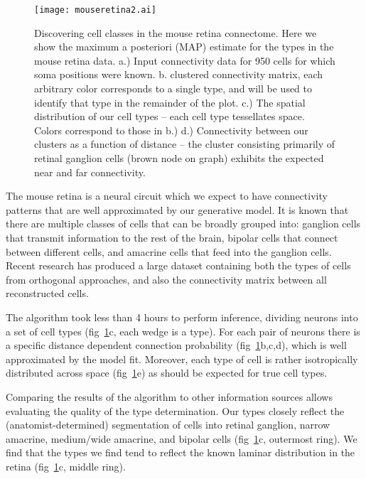 \documentclass{article}
\begin{document}
\begin{figure}
  \centering 
  \centerline{\texttt{[image: mouseretina2.ai]}}
  \caption{Discovering cell classes in the mouse retina connectome. Here
we show the maximum a posteriori (MAP) estimate for the types in the mouse
retina data. 
    a.) Input connectivity data for 950 cells for which soma positions
    were known. b. clustered connectivity matrix, each arbitrary color
    corresponds to a single type, and will be used to identify that type in the remainder
    of the plot. c.)  The spatial distribution of our cell types
    -- each cell type tessellates space. Colors correspond to those in b.)
    d.) Connectivity between our clusters as a function
    of distance -- the cluster consisting primarily of retinal
    ganglion cells (brown node on graph) exhibits the expected near and
    far connectivity.}
\label{fig:mouseretina}
\end{figure}

The mouse retina \autocite{Masland2001} is a neural circuit which we
expect to have connectivity patterns that are well approximated by our
generative model. It is known that there are multiple classes of cells
that can be broadly grouped into: ganglion cells that transmit
information to the rest of the brain, bipolar cells that connect
between different cells, and amacrine cells that feed into the
ganglion cells. Recent research \autocite{Helmstaedter2013} has
produced a large dataset containing both the types of cells from
orthogonal approaches, and also the connectivity matrix between all
reconstructed cells.

The algorithm took less than 4 hours to perform inference, dividing
neurons into a set of cell types (fig~\ref{fig:mouseretina}c, each
wedge is a type). For each pair of neurons there is a specific
distance dependent connection probability
(fig~\ref{fig:mouseretina}b,c,d), which is well approximated by the
model fit. Moreover, each type of cell is rather isotropically
distributed across space (fig~\ref{fig:mouseretina}e) as should be
expected for true cell types.

Comparing the results of the algorithm to other information sources
allows evaluating the quality of the type determination. Our types
closely reflect the (anatomist-determined) segmentation of cells into
retinal ganglion, narrow amacrine, medium/wide amacrine, and bipolar
cells (fig~\ref{fig:mouseretina}c, outermost ring). We find that the
types we find tend to reflect the known laminar distribution in the
retina (fig~\ref{fig:mouseretina}c, middle ring). 
\end{document}
